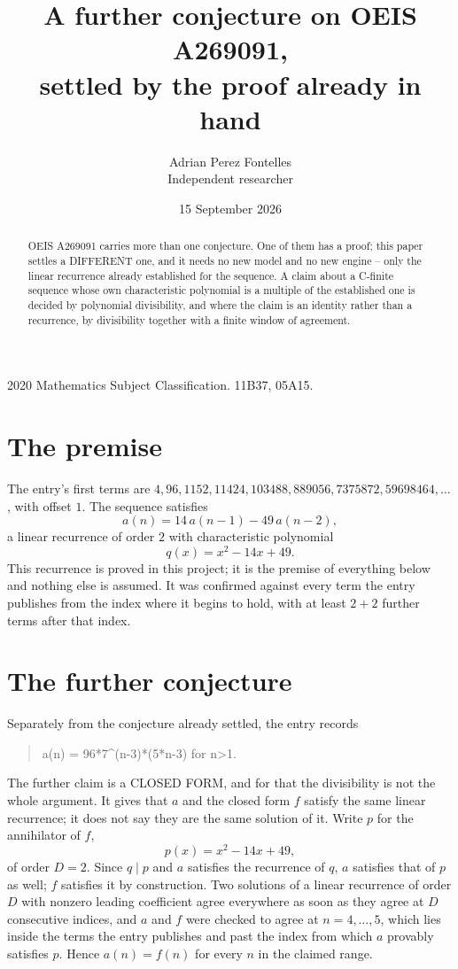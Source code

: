 \documentclass[11pt,a4paper]{article}
\title{A further conjecture on OEIS A269091,\\ \large settled by the proof already in hand}
\author{Adrian Perez Fontelles\\ \small Independent researcher}
\date{15 September 2026}
\theoremstyle{plain}
\theoremstyle{definition}
\begin{document}
\maketitle

\begin{abstract}
OEIS A269091 carries more than one conjecture. One of them has a proof; this paper settles a
DIFFERENT one, and it needs no new model and no new engine -- only the linear recurrence already
established for the sequence. A claim about a C-finite sequence whose own characteristic
polynomial is a multiple of the established one is decided by polynomial divisibility, and where
the claim is an identity rather than a recurrence, by divisibility together with a finite window
of agreement.
\end{abstract}

\noindent\small 2020 Mathematics Subject Classification. 11B37, 05A15.\normalsize

\section{The premise}

The entry's first terms are $4, 96, 1152, 11424, 103488, 889056, 7375872, 59698464,\dots$, with offset $1$. The sequence satisfies
\[
  a(n)=14\,a(n-1) - 49\,a(n-2) ,
\]
a linear recurrence of order $2$ with characteristic polynomial
\[
  q(x)=x^{2} - 14 x + 49 .
\]
This recurrence is proved in this project; it is the premise of everything below and nothing else is assumed.
It was confirmed against every term the entry publishes from the index where it begins to hold,
with at least $2+2$ further terms after that index.

\section{The further conjecture}

Separately from the conjecture already settled, the entry records

\begin{quote}\raggedright a(n) = 96*7\^{}(n-3)*(5*n-3) for n>1.\end{quote}

The further claim is a CLOSED FORM, and for that the divisibility is not the whole argument. It
gives that $a$ and the closed form $f$ satisfy the same linear recurrence; it does not say they
are the same solution of it. Write $p$ for the annihilator of $f$,
\[
  p(x)=x^{2} - 14 x + 49 ,
\]
of order $D=2$. Since $q\mid p$ and $a$ satisfies the recurrence of $q$, $a$ satisfies that of
$p$ as well; $f$ satisfies it by construction. Two solutions of a linear recurrence of order $D$
with nonzero leading coefficient agree everywhere as soon as they agree at $D$ consecutive
indices, and $a$ and $f$ were checked to agree at $n=4,\dots,5$,
which lies inside the terms the entry publishes and past the index from which $a$ provably
satisfies $p$. Hence $a(n)=f(n)$ for every $n$ in the claimed range.
\end{document}

